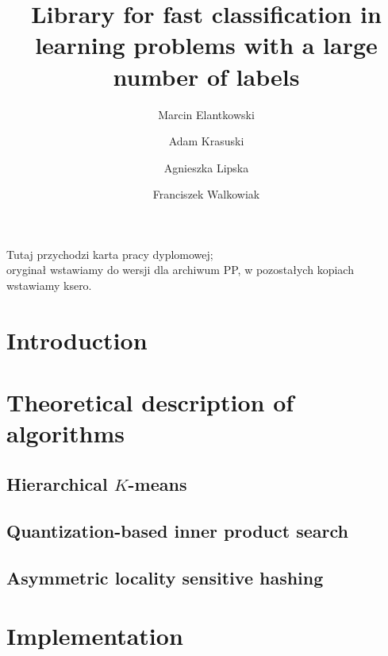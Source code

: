 \documentclass[english,bachelor,a4paper,twoside,11pt]{ppfcmthesis}
\author{Marcin Elantkowski \album{116353} \and
Adam Krasuski \album{122479} \and
Agnieszka Lipska\album{122467} \and
Franciszek Walkowiak \album{122592}}
\title{Library for fast classification in learning problems with a large number of labels}
\begin{document}
\frontmatter\pagestyle{empty}%
\maketitle\cleardoublepage%

\thispagestyle{empty}\vspace*{\fill}%
\begin{center}Tutaj przychodzi karta pracy dyplomowej;\\oryginał wstawiamy do wersji dla archiwum PP, w pozostałych kopiach wstawiamy ksero.\end{center}%
\vfill \cleardoublepage%

\pagestyle{ppfcmthesis}%

%

%

\tableofcontents* \cleardoublepage%



\mainmatter%
\chapter{Introduction}
	
\chapter{Theoretical description of algorithms}
	
	\section{Hierarchical $K$-means}
	
	\section{Quantization-based inner product search}
	
	\section{Asymmetric locality sensitive hashing}
	
\chapter{Implementation}
\end{document}
